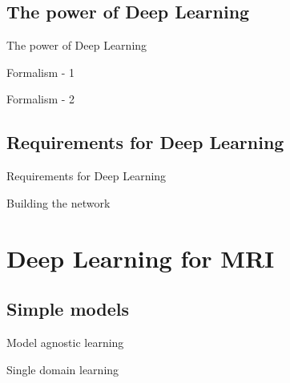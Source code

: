 \documentclass[aspectratio=169,xcolor=dvipsnames]{beamer}
\begin{document}
\subsection{The power of Deep Learning}
\begin{frame}{The power of Deep Learning}
\end{frame}

\begin{frame}{Formalism - 1}
\end{frame}

\begin{frame}{Formalism - 2}
\end{frame}

\subsection{Requirements for Deep Learning}
\begin{frame}{Requirements for Deep Learning}
\end{frame}

\begin{frame}{Building the network}
\end{frame}


\section{Deep Learning for MRI}
\subsection{Simple models}
\begin{frame}{Model agnostic learning}
\end{frame}

\begin{frame}{Single domain learning}
\end{frame}
\end{document}
